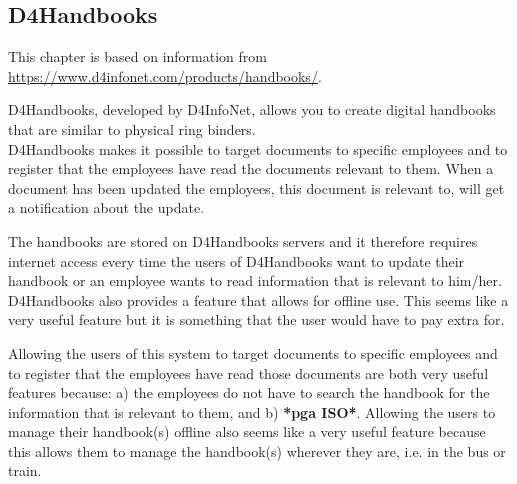 \subsection{D4Handbooks}
This chapter is based on information from \url{https://www.d4infonet.com/products/handbooks/}.

D4Handbooks, developed by D4InfoNet, allows you to create digital handbooks that are similar to physical ring binders.\\
D4Handbooks makes it possible to target documents to specific employees and to register that the employees have read the documents relevant to them. When a document has been updated the employees, this document is relevant to, will get a notification about the update.

The handbooks are stored on D4Handbooks servers and it therefore requires internet access every time the users of D4Handbooks want to update their handbook or an employee wants to read information that is relevant to him/her.\\
D4Handbooks also provides a feature that allows for offline use. This seems like a very useful feature but it is something that the user would have to pay extra for.

Allowing the users of this system to target documents to specific employees and to register that the employees have read those documents are both very useful features because: a) the employees do not have to search the handbook for the information that is relevant to them, and b) \textbf{*pga ISO*}. Allowing the users to manage their handbook(s) offline also seems like a very useful feature because this allows them to manage the handbook(s) wherever they are, i.e. in the bus or train.
